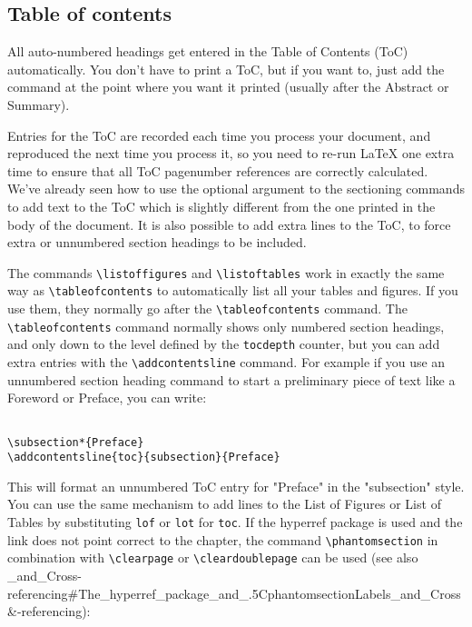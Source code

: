 \subsection{ Table of contents }

All auto-numbered headings get entered in the Table of Contents (ToC) automatically. You don't have to print a ToC, but if you want to, just add the command \texttt{\tableofcontents} at the point where you want it printed (usually after the Abstract or
Summary).

Entries for the ToC are recorded each time you process your document, and reproduced the next time you process it, so you need to re-run LaTeX one extra time to ensure that all ToC pagenumber references are correctly calculated. We've already seen how to use the optional argument to the sectioning commands to add text to the ToC which is slightly different from the one printed in the body of the document. It is also possible to add extra lines to the ToC, to force extra or unnumbered section headings to be included.

The commands \lstinline{\listoffigures} and \lstinline{\listoftables} work in exactly the same way as \lstinline{\tableofcontents} to automatically list all your tables and figures. If you use them, they normally go after the \lstinline{\tableofcontents} command. The \lstinline{\tableofcontents} command normally shows only numbered section headings, and only down to the level defined by the \lstinline{tocdepth} counter, but you can add extra entries with the \lstinline{\addcontentsline} command. For example if you use an unnumbered section heading command to start a preliminary piece of text like a Foreword or Preface, you can write:

\begin{lstlisting}

\subsection*{Preface}
\addcontentsline{toc}{subsection}{Preface}

\end{lstlisting}


This will format an unnumbered ToC entry for "Preface" in the "subsection" style. You can use the same mechanism to add lines to the List of Figures or List of Tables by substituting \texttt{lof} or \texttt{lot} for \texttt{toc}. If the hyperref package is used and the link does not point correct to the chapter, the command \lstinline{\phantomsection} in combination with \lstinline{\clearpage} or \lstinline{\cleardoublepage} can be used (see also \_and\_Cross-referencing#The\_hyperref\_package\_and\_.5CphantomsectionLabels\_and\_Cross &-referencing):

